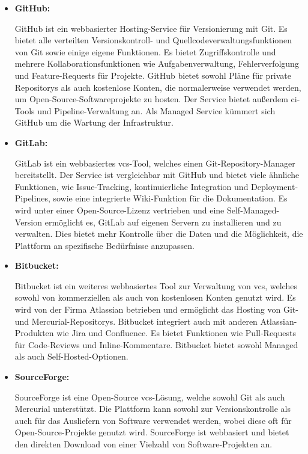 \begin{itemize}
    \item{
        \textbf{GitHub:}\par
        GitHub ist ein webbasierter Hosting-Service für Versionierung mit Git.
        Es bietet alle verteilten Versionskontroll- und Quellcodeverwaltungsfunktionen von Git sowie einige
        eigene Funktionen.
        Es bietet Zugriffskontrolle und mehrere Kollaborationsfunktionen wie Aufgabenverwaltung, Fehlerverfolgung und
        Feature-Requests für Projekte.
        GitHub bietet sowohl Pläne für private Repositorys als auch kostenlose Konten, die normalerweise verwendet
        werden, um Open-Source-Softwareprojekte zu hosten.
        Der Service bietet außerdem \acrshort{ci}-Tools und Pipeline-Verwaltung an.
        Als Managed Service kümmert sich GitHub um die Wartung der Infrastruktur.
    }

    \item{
        \textbf{GitLab:}\par
        GitLab ist ein webbasiertes \acrshort{vcs}-Tool, welches einen Git-Repository-Manager bereitstellt.
        Der Service ist vergleichbar mit GitHub und bietet viele ähnliche Funktionen, wie Issue-Tracking,
        kontinuierliche Integration und Deployment-Pipelines, sowie eine integrierte Wiki-Funktion für die
        Dokumentation.
        Es wird unter einer Open-Source-Lizenz vertrieben und eine Self-Managed-Version ermöglicht es,
        GitLab auf eigenen Servern zu installieren und zu verwalten.
        Dies bietet mehr Kontrolle über die Daten und die Möglichkeit, die Plattform an spezifische Bedürfnisse
        anzupassen.
    }

    \item{
        \textbf{Bitbucket:}\par
        Bitbucket ist ein weiteres webbasiertes Tool zur Verwaltung von \acrshort{vcs}, welches sowohl von
        kommerziellen als auch von kostenlosen Konten genutzt wird.
        Es wird von der Firma Atlassian betrieben und ermöglicht das Hosting von Git- und Mercurial-Repositorys.
        Bitbucket integriert auch mit anderen Atlassian-Produkten wie Jira und Confluence.
        Es bietet Funktionen wie Pull-Requests für Code-Reviews und Inline-Kommentare.
        Bitbucket bietet sowohl Managed als auch Self-Hosted-Optionen.
    }

    \item{
        \textbf{SourceForge:}\par
        SourceForge ist eine Open-Source \acrshort{vcs}-Lösung, welche sowohl Git als auch Mercurial unterstützt.
        Die Plattform kann sowohl zur Versionskontrolle als auch für das Ausliefern von Software verwendet werden,
        wobei diese oft für Open-Source-Projekte genutzt wird.
        SourceForge ist webbasiert und bietet den direkten Download von einer Vielzahl von Software-Projekten an.
    }
\end{itemize}


